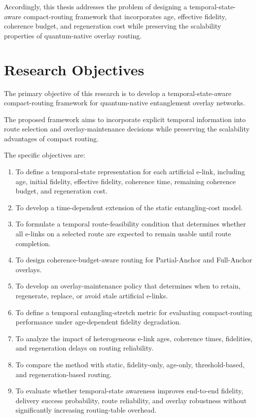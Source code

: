 Accordingly, this thesis addresses the problem of designing a temporal-state-aware compact-routing framework that incorporates age, effective fidelity, coherence budget, and regeneration cost while preserving the scalability properties of quantum-native overlay routing.
\section{Research Objectives}
The primary objective of this research is to develop a temporal-state-aware compact-routing framework for quantum-native entanglement overlay networks.

The proposed framework aims to incorporate explicit temporal information into route selection and overlay-maintenance decisions while preserving the scalability advantages of compact routing.

The specific objectives are:

\begin{enumerate}
    \item To define a temporal-state representation for each artificial e-link, including age, initial fidelity, effective fidelity, coherence time, remaining coherence budget, and regeneration cost.

    \item To develop a time-dependent extension of the static entangling-cost model.

    \item To formulate a temporal route-feasibility condition that determines whether all e-links on a selected route are expected to remain usable until route completion.

    \item To design coherence-budget-aware routing for Partial-Anchor and Full-Anchor overlays.

    \item To develop an overlay-maintenance policy that determines when to retain, regenerate, replace, or avoid stale artificial e-links.

    \item To define a temporal entangling-stretch metric for evaluating compact-routing performance under age-dependent fidelity degradation.

    \item To analyze the impact of heterogeneous e-link ages, coherence times, fidelities, and regeneration delays on routing reliability.

    \item To compare the method with static, fidelity-only, age-only,
threshold-based, and regeneration-based routing.

    \item To evaluate whether temporal-state awareness improves end-to-end fidelity, delivery success probability, route reliability, and overlay robustness without significantly increasing routing-table overhead.
\end{enumerate}

